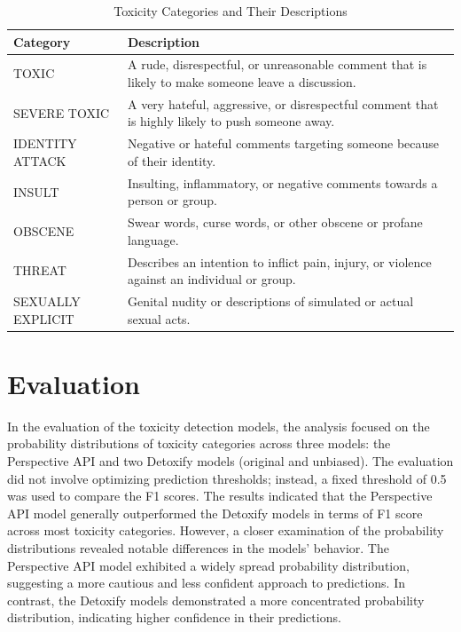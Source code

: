 \begin{table}[h]
    \centering
    \renewcommand{\arraystretch}{1.3}
    \begin{tabularx}{\textwidth}{lX}
        \toprule
        \textbf{Category} & \textbf{Description} \\
        \midrule
        TOXIC & A rude, disrespectful, or unreasonable comment that is likely to make someone leave a discussion. \\
        SEVERE TOXIC & A very hateful, aggressive, or disrespectful comment that is highly likely to push someone away. \\
        IDENTITY ATTACK & Negative or hateful comments targeting someone because of their identity. \\
        INSULT & Insulting, inflammatory, or negative comments towards a person or group. \\
        OBSCENE & Swear words, curse words, or other obscene or profane language. \\
        THREAT & Describes an intention to inflict pain, injury, or violence against an individual or group. \\
        SEXUALLY EXPLICIT & Genital nudity or descriptions of simulated or actual sexual acts. \\
        \bottomrule
    \end{tabularx}
    \caption{Toxicity Categories and Their Descriptions}
\end{table}

\section{Evaluation} \label{evaluation}

In the evaluation of the toxicity detection models, the analysis focused on the probability distributions of toxicity categories across three models: the Perspective API and two Detoxify models (original and unbiased). The evaluation did not involve optimizing prediction thresholds; instead, a fixed threshold of 0.5 was used to compare the F1 scores. The results indicated that the Perspective API model generally outperformed the Detoxify models in terms of F1 score across most toxicity categories. However, a closer examination of the probability distributions revealed notable differences in the models' behavior. The Perspective API model exhibited a widely spread probability distribution, suggesting a more cautious and less confident approach to predictions. In contrast, the Detoxify models demonstrated a more concentrated probability distribution, indicating higher confidence in their predictions.

